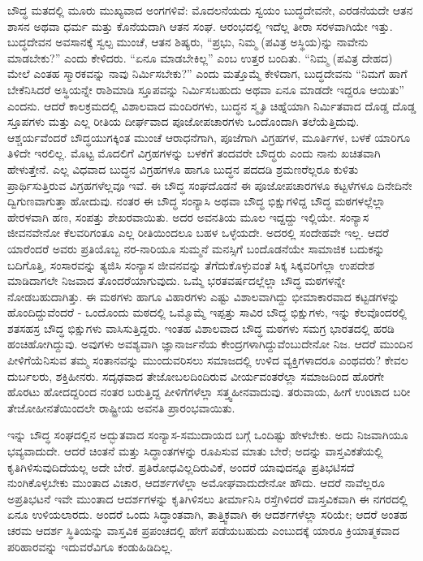 ಬೌದ್ಧ ಮತದಲ್ಲಿ ಮೂರು ಮುಖ್ಯವಾದ ಅಂಗಗಳಿವೆ: ಮೊದಲನೆಯದು ಸ್ವಯಂ ಬುದ್ಧದೇವನೇ, ಎರಡನೆಯದೇ ಆತನ ಶಾಸನ ಅಥವಾ ಧರ್ಮ ಮತ್ತು ಕೊನೆಯದಾಗಿ ಆತನ ಸಂಘ. ಆರಂಭದಲ್ಲಿ ಇದೆಲ್ಲ ತೀರಾ ಸರಳವಾಗಿಯೇ ಇತ್ತು. ಬುದ್ಧದೇವನ ಅವಸಾನಕ್ಕೆ ಸ್ವಲ್ಪ ಮುಂಚೆ, ಆತನ ಶಿಷ್ಯರು, “ಪ್ರಭು, ನಿಮ್ಮ (ಪವಿತ್ರ ಅಸ್ಥಿಯ)ನ್ನು ನಾವೇನು ಮಾಡಬೇಕು?” ಎಂದು ಕೇಳಿದರು. “ಏನೂ ಮಾಡಬೇಕಿಲ್ಲ” ಎಂಬ ಉತ್ತರ ಬಂದಿತು. “ನಿಮ್ಮ (ಪವಿತ್ರ ದೇಹದ) ಮೇಲೆ ಎಂತಹ ಸ್ಮಾರಕವನ್ನು ನಾವು ನಿರ್ಮಿಸಬೇಕು?” ಎಂದು ಮತ್ತೊಮ್ಮೆ ಕೇಳಿದಾಗ, ಬುದ್ಧದೇವನು “ನಿಮಗೆ ಹಾಗೆ ಬೇಕೆನಿಸಿದರೆ ಅಸ್ಥಿಯನ್ನೇ ರಾಶಿಮಾಡಿ ಸ್ತೂಪವನ್ನು ನಿರ್ಮಿಸಬಹುದು ಅಥವಾ ಏನೂ ಮಾಡದೇ ಇದ್ದರೂ ಆಯಿತು” ಎಂದನು. ಆದರೆ ಕಾಲಕ್ರಮದಲ್ಲಿ ವಿಶಾಲವಾದ ಮಂದಿರಗಳು, ಬುದ್ಧನ ಸ್ಮೃತಿ ಚಿಹ್ನೆಯಾಗಿ ನಿರ್ಮಿತವಾದ ದೊಡ್ಡ ದೊಡ್ಡ ಸ್ತೂಪಗಳು ಮತ್ತು ಎಲ್ಲ ರೀತಿಯ ದೀರ್ಘವಾದ ಪೂಜೋಪಚಾರಗಳು ಒಂದೊಂದಾಗಿ ತಲೆಯೆತ್ತಿದುವು. ಆಶ್ಚರ್ಯವೆಂದರೆ ಬೌದ್ಧಯುಗಕ್ಕಿಂತ ಮುಂಚೆ ಆರಾಧನೆಗಾಗಿ, ಪೂಜೆಗಾಗಿ ವಿಗ್ರಹಗಳ, ಮೂರ್ತಿಗಳ, ಬಳಕೆ ಯಾರಿಗೂ ತಿಳಿದೇ ಇರಲಿಲ್ಲ. ಮೊಟ್ಟ ಮೊದಲಿಗೆ ವಿಗ್ರಹಗಳನ್ನು ಬಳಕೆಗೆ ತಂದವರೇ ಬೌದ್ಧರು ಎಂದು ನಾನು ಖಚಿತವಾಗಿ ಹೇಳುತ್ತೇನೆ. ಎಲ್ಲ ವಿಧವಾದ ಬುದ್ಧನ ವಿಗ್ರಹಗಳೂ ಹಾಗೂ ಬುದ್ಧನ ಪದದಡಿ ಶ್ರಮಣರೆಲ್ಲರೂ ಕುಳಿತು ಪ್ರಾರ್ಥಿಸುತ್ತಿರುವ ವಿಗ್ರಹಗಳೆಲ್ಲವೂ ಇವೆ. ಈ ಬೌದ್ಧ ಸಂಘದೊಡನೆ ಈ ಪೂಜೋಪಚಾರಗಳೂ ಕಟ್ಟಳೆಗಳೂ ದಿನೇದಿನೇ ದ್ವಿಗುಣವಾಗುತ್ತಾ ಹೋದುವು. ನಂತರ ಈ ಬೌದ್ಧ ಸಂನ್ಯಾಸಿ ಅಥವಾ ಬೌದ್ಧ ಭಿಕ್ಷುಗಳಿದ್ದ ಬೌದ್ಧ ಮಠಗಳಲ್ಲೆಲ್ಲಾ ಹೇರಳವಾಗಿ ಹಣ, ಸಂಪತ್ತು ಶೇಖರವಾಯಿತು. ಅದರ ಅವನತಿಯ ಮೂಲ ಇದ್ದದ್ದು ಇಲ್ಲಿಯೇ. ಸಂನ್ಯಾಸ ಜೀವನವೇನೋ ಕೆಲವರಿಗಂತೂ ಎಲ್ಲ ರೀತಿಯಿಂದಲೂ ಬಹಳ ಒಳ್ಳೆಯದೇ. ಅದರಲ್ಲಿ ಸಂದೇಹವೇ ಇಲ್ಲ. ಆದರೆ ಯಾರೆಂದರೆ ಅವರು ಪ್ರತಿಯೊಬ್ಬ ನರ-ನಾರಿಯೂ ಸುಮ್ಮನೆ ಮನಸ್ಸಿಗೆ ಬಂದೊಡನೆಯೇ ಸಾಮಾಜಿಕ ಬದುಕನ್ನು ಬದಿಗೊತ್ತಿ, ಸಂಸಾರವನ್ನು ತ್ಯಜಿಸಿ ಸಂನ್ಯಾಸ ಜೀವನವನ್ನು ತೆಗೆದುಕೊಳ್ಳುವಂತೆ ಸಿಕ್ಕ ಸಿಕ್ಕವರಿಗೆಲ್ಲಾ ಉಪದೇಶ ಮಾಡಿದಾಗಲೇ ನಿಜವಾದ ತೊಂದರೆಯಾಗುವುದು. ಒಮ್ಮೆ ಭರತವರ್ಷದಲ್ಲೆಲ್ಲಾ ಬೌದ್ಧ ಮಠಗಳನ್ನೇ ನೋಡಬಹುದಾಗಿತ್ತು. ಈ ಮಠಗಳು ಹಾಗೂ ವಿಹಾರಗಳು ಎಷ್ಟು ವಿಶಾಲವಾಗಿದ್ದು ಭೀಮಾಕಾರವಾದ ಕಟ್ಟಡಗಳನ್ನು ಹೊಂದಿದ್ದುವೆಂದರೆ - ಒಂದೊಂದು ಮಠದಲ್ಲಿ ಒಮ್ಮೊಮ್ಮೆ ಇಪ್ಪತ್ತು ಸಾವಿರ ಬೌದ್ಧ ಭಿಕ್ಷುಗಳು, ಇನ್ನು ಕೆಲವೊಂದರಲ್ಲಿ ಶತಸಹಸ್ರ ಬೌದ್ಧ ಭಿಕ್ಷುಗಳು ವಾಸಿಸುತ್ತಿದ್ದರು. ಇಂತಹ ವಿಶಾಲವಾದ ಬೌದ್ಧ ಮಠಗಳು ಸಮಗ್ರ ಭಾರತದಲ್ಲಿ ಹರಡಿ ಹಂಚಿಹೋಗಿದ್ದುವು. ಅವುಗಳು ಅವಶ್ಯವಾಗಿ ಜ್ಞಾನಾರ್ಜನೆಯ ಕೇಂದ್ರಗಳಾಗಿದ್ದುವೆಂಬುದೇನೋ ನಿಜ. ಆದರೆ ಮುಂದಿನ ಪೀಳಿಗೆಯೆನಿಸುವ ತಮ್ಮ ಸಂತಾನವನ್ನು ಮುಂದುವರಿಸಲು ಸಮಾಜದಲ್ಲಿ ಉಳಿದ ವ್ಯಕ್ತಿಗಳಾದರೂ ಎಂಥವರು? ಕೇವಲ ದುರ್ಬಲರು, ಶಕ್ತಿಹೀನರು. ಸದೃಢವಾದ ತೇಜೋಬಲದಿಂದಿರುವ ವೀರ್ಯವಂತರೆಲ್ಲಾ ಸಮಾಜದಿಂದ ಹೊರಗೇ ಹೊರಟು ಹೋದದ್ದರಿಂದ ನಂತರ ಬರುತ್ತಿದ್ದ ಪೀಳಿಗೆಗಳೆಲ್ಲಾ ಸತ್ತ್ವಹೀನವಾದುವು. ತರುವಾಯ, ಹೀಗೆ ಉಂಟಾದ ಬರೀ ತೇಜೋಹೀನತೆಯಿಂದಲೇ ರಾಷ್ಟ್ರೀಯ ಅವನತಿ ಪ್ರಾರಂಭವಾಯಿತು.

ಇನ್ನು ಬೌದ್ಧ ಸಂಘದಲ್ಲಿನ ಅದ್ಭುತವಾದ ಸಂನ್ಯಾಸ-ಸಮುದಾಯದ ಬಗ್ಗೆ ಒಂದಿಷ್ಟು ಹೇಳಬೇಕು. ಅದು ನಿಜವಾಗಿಯೂ ಭವ್ಯವಾದುದೇ. ಆದರೆ ಚಿಂತನೆ ಮತ್ತು ಸಿದ್ಧಾಂತಗಳನ್ನು ರೂಪಿಸುವ ಮಾತು ಬೇರೆ; ಅದನ್ನು ವಾಸ್ತವಿಕತೆಯಲ್ಲಿ ಕೃತಿಗಿಳಿಸುವುದಿದೆಯಲ್ಲ ಅದೇ ಬೇರೆ. ಪ್ರತಿರೋಧವಿಲ್ಲದಿರುವಿಕೆ, ಅಂದರೆ ಯಾವುದನ್ನೂ ಪ್ರತಿಭಟಿಸದೆ ನುಂಗಿಕೊಳ್ಳಬೇಕು ಮುಂತಾದ ವಿಚಾರ, ಆದರ್ಶಗಳೆಲ್ಲಾ ಅಮೋಘವಾದುದೇನೋ ಹೌದು. ಆದರೆ ನಾವೆಲ್ಲರೂ ಅಪ್ರತಿಭಟನೆ ಇವೇ ಮುಂತಾದ ಆದರ್ಶಗಳನ್ನು ಕೃತಿಗಿಳಿಸಲು ತೀರ್ಮಾನಿಸಿ ರಸ್ತೆಗಿಳಿದರೆ ವಾಸ್ತವಿಕವಾಗಿ ಈ ನಗರದಲ್ಲಿ ಏನೂ ಉಳಿಯಲಾರದು. ಅಂದರೆ ಒಂದು ಸಿದ್ಧಾಂತವಾಗಿ, ತಾತ್ತ್ವಿಕವಾಗಿ ಈ ಆದರ್ಶಗಳೆಲ್ಲಾ ಸರಿಯೇ; ಆದರೆ ಅಂತಹ ಚರಮ ಆದರ್ಶ ಸ್ಥಿತಿಯನ್ನು ವಾಸ್ತವಿಕ ಪ್ರಪಂಚದಲ್ಲಿ ಹೇಗೆ ಪಡೆಯಬಹುದು ಎಂಬುದಕ್ಕೆ ಯಾರೂ ಕ್ರಿಯಾತ್ಮಕವಾದ ಪರಿಹಾರವನ್ನು ಇದುವರೆವಿಗೂ ಕಂಡುಹಿಡಿದಿಲ್ಲ.

